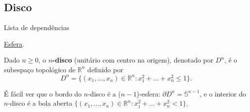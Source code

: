 \subsection{Disco}
\label{disco-def}
\begin{titlemize}{Lista de dependências}
	\item \hyperref[esfera-def]{Esfera}.
\end{titlemize}
\begin{defi}
     Dado $n\geq 0$, o \textbf{$n$-disco} (unitário com centro na origem), denotado por $D^n$, é o subespaço topológico de $\mathbb{R}^{n}$ definido por 
     \[D^n=\{(x_1,...,x_n)\in \mathbb{R}^{n}:x_1^2+...+x_n^2\le 1\}.\]
\end{defi}
É fácil ver que o bordo do $n$-disco é a ($n-1$)-esfera: $\partial D^n = \mathbb{S}^{n-1}$, e o interior do $n$-disco é a bola aberta $\{(x_1,...,x_n)\in \mathbb{R}^n:x_1^2+...+x_n^2<1\}$.